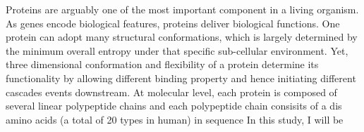Proteins are arguably one of the most important component in a living organism. As genes encode biological features, proteins deliver biological functions. One protein can adopt many structural conformations, which is largely determined by the minimum overall entropy under that specific sub-cellular environment. Yet, three dimensional conformation and flexibility of a protein determine its functionality by allowing different binding property and hence initiating different cascades events downstream. At molecular level, each protein is composed of several linear polypeptide chains and each polypeptide chain consisits of a dis amino acids (a total of 20 types in human) in sequence  In this study, I will be 